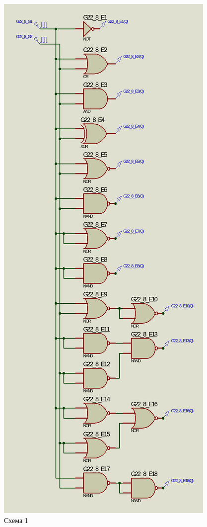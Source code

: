 \documentclass{article}
\begin{document}
\begin{normalsize}
	\begin{figure}[H]
		\centering
		\includegraphics[scale=0.34]{s1}	
		\caption{Схема 1}
	\end{figure}
\vspace{-2mm}

\end{normalsize}
\end{document}
